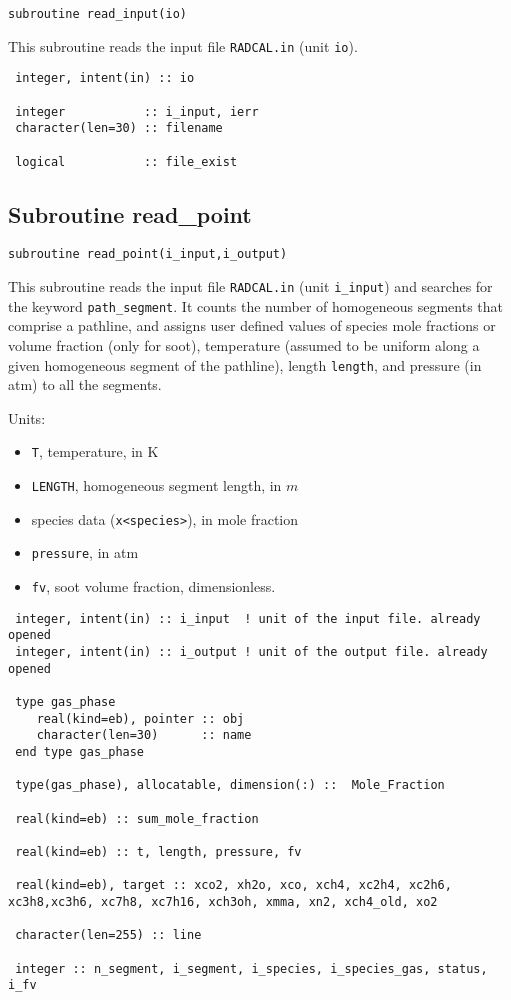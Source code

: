 \begin{lstlisting}
subroutine read_input(io)
\end{lstlisting}
 This subroutine reads the input file \verb=RADCAL.in= (unit \verb=io=).

\begin{lstlisting}
 integer, intent(in) :: io

 integer           :: i_input, ierr
 character(len=30) :: filename

 logical           :: file_exist

\end{lstlisting}

\subsection{Subroutine read\_point}
\label{sub:read_point}

\begin{lstlisting}
subroutine read_point(i_input,i_output)
\end{lstlisting}
 This subroutine reads the input file \verb=RADCAL.in= (unit \verb=i_input=) and searches for the keyword \verb=path_segment=. It counts the number of homogeneous segments that comprise a pathline, and assigns user defined values of species mole fractions or volume fraction (only for soot), temperature (assumed to be uniform along a given homogeneous segment of the pathline), length \verb=length=, and pressure (in atm) to all the segments.

 Units:
 \begin{itemize}
  \item \verb=T=, temperature, in K
  \item \verb=LENGTH=, homogeneous segment length, in $m$
  \item species data (\verb=x<species>=), in mole fraction
  \item \verb=pressure=, in atm
  \item \verb=fv=, soot volume fraction, dimensionless.
 \end{itemize}

\begin{lstlisting}
 integer, intent(in) :: i_input  ! unit of the input file. already opened
 integer, intent(in) :: i_output ! unit of the output file. already opened

 type gas_phase
    real(kind=eb), pointer :: obj
    character(len=30)      :: name
 end type gas_phase

 type(gas_phase), allocatable, dimension(:) ::  Mole_Fraction

 real(kind=eb) :: sum_mole_fraction

 real(kind=eb) :: t, length, pressure, fv

 real(kind=eb), target :: xco2, xh2o, xco, xch4, xc2h4, xc2h6, xc3h8,xc3h6, xc7h8, xc7h16, xch3oh, xmma, xn2, xch4_old, xo2

 character(len=255) :: line

 integer :: n_segment, i_segment, i_species, i_species_gas, status, i_fv

\end{lstlisting}


